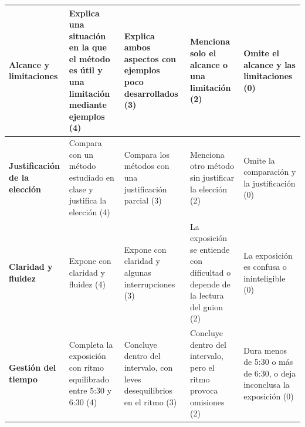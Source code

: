 \documentclass[a4,11pt]{aleph-notas}
\begin{document}
\begin{center}
\begin{tabular}{L{3cm}*{4}{L{2.9cm}}}
\textbf{Alcance y limitaciones}
& Explica una situación en la que el método es útil y una limitación mediante ejemplos (4)
& Explica ambos aspectos con ejemplos poco desarrollados (3)
& Menciona solo el alcance o una limitación (2)
& Omite el alcance y las limitaciones (0) \\ \midrule

\textbf{Justificación de la elección}
& Compara con un método estudiado en clase y justifica la elección (4)
& Compara los métodos con una justificación parcial (3)
& Menciona otro método sin justificar la elección (2)
& Omite la comparación y la justificación (0) \\ \midrule

\textbf{Claridad y fluidez}
& Expone con claridad y fluidez (4)
& Expone con claridad y algunas interrupciones (3)
& La exposición se entiende con dificultad o depende de la lectura del guion (2)
& La exposición es confusa o ininteligible (0) \\ \midrule

\textbf{Gestión del tiempo}
& Completa la exposición con ritmo equilibrado entre 5:30 y 6:30 (4)
& Concluye dentro del intervalo, con leves desequilibrios en el ritmo (3)
& Concluye dentro del intervalo, pero el ritmo provoca omisiones (2)
& Dura menos de 5:30 o más de 6:30, o deja inconclusa la exposición (0) \\ \bottomrule
\end{tabular}
\end{center}
\end{document}
